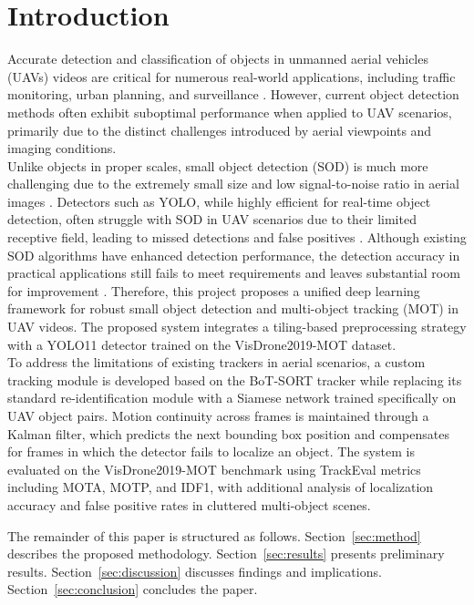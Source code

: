 \documentclass[conference]{IEEEtran}
\begin{document}
\section{Introduction}
Accurate detection and classification of objects in unmanned aerial vehicles (UAVs) videos are critical for numerous real-world applications, including traffic monitoring, urban planning, and surveillance \cite{ref1}. However, current object detection methods often exhibit suboptimal performance when applied to UAV scenarios, primarily due to the distinct challenges introduced by aerial viewpoints and imaging conditions.\\
Unlike objects in proper scales, small object detection (SOD) is much more challenging due to the extremely small size and low signal-to-noise ratio in aerial images \cite{ref2}. Detectors such as YOLO, while highly efficient for real-time object detection, often struggle with SOD in UAV scenarios due to their limited receptive field, leading to missed detections and false positives \cite{ref3}.
Although existing SOD algorithms have enhanced detection performance, the detection accuracy in practical applications still fails to meet requirements and leaves substantial room for improvement \cite{ref4}.
Therefore, this project proposes a unified deep learning framework for robust small object detection and multi-object tracking (MOT) in UAV videos. The proposed system integrates a tiling-based preprocessing strategy with a YOLO11 detector trained on the VisDrone2019-MOT dataset. \\
To address the limitations of existing trackers in aerial scenarios, a custom tracking module is developed based on the BoT-SORT tracker while replacing its standard re-identification module with a Siamese network trained specifically on UAV object pairs. Motion continuity across frames is maintained through a Kalman filter, which predicts the next bounding box position and compensates for frames in which the detector fails to localize an object. The system is evaluated on the VisDrone2019-MOT benchmark using TrackEval metrics including MOTA, MOTP, and IDF1, with additional analysis of localization accuracy and false positive rates in cluttered multi-object scenes.

The remainder of this paper is structured as follows. Section~\ref{sec:method}
describes the proposed methodology. Section~\ref{sec:results} presents
preliminary results. Section~\ref{sec:discussion} discusses findings and
implications. Section~\ref{sec:conclusion} concludes the paper.
\end{document}
